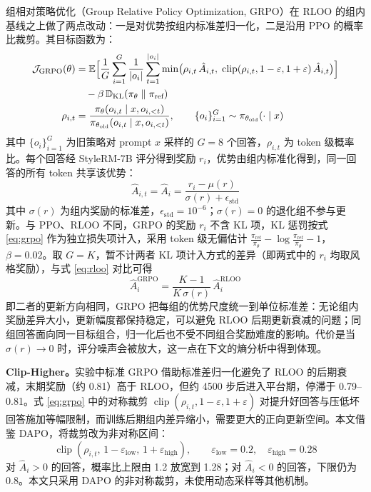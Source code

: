 \documentclass[fontset=fandol,type=master,campus=shenzhen,etitleauto=true]{hithesisbook}
\begin{document}
组相对策略优化（Group Relative Policy Optimization, GRPO）\cite{ref34}在 RLOO 的组内基线之上做了两点改动：一是对优势按组内标准差归一化，二是沿用 PPO 的概率比裁剪。其目标函数为：
\begin{equation}\label{eq:grpo}
\begin{aligned}
\mathcal{J}_{\text{GRPO}}(\theta) &= \mathbb{E} \Bigl[ \frac{1}{G}\sum_{i=1}^{G} \frac{1}{|o_i|}\sum_{t=1}^{|o_i|} \min\bigl( \rho_{i,t}\, \hat{A}_{i,t},\; \operatorname{clip}(\rho_{i,t}, 1-\varepsilon, 1+\varepsilon)\, \hat{A}_{i,t} \bigr) \Bigr] \\
&\quad - \beta\, \mathbb{D}_{\text{KL}}(\pi_\theta \parallel \pi_{\text{ref}}) \\
\rho_{i,t} &= \frac{\pi_\theta(o_{i,t} \mid x, o_{i,<t})}{\pi_{\theta_{\text{old}}}(o_{i,t} \mid x, o_{i,<t})}, \qquad \{o_i\}_{i=1}^{G} \sim \pi_{\theta_{\text{old}}}(\cdot \mid x)
\end{aligned}
\end{equation}
其中 $\{o_i\}_{i=1}^{G}$ 为旧策略对 prompt $x$ 采样的 $G = 8$ 个回答，$\rho_{i,t}$ 为 token 级概率比。每个回答经 StyleRM-7B 评分得到奖励 $r_i$，优势由组内标准化得到，同一回答的所有 token 共享该优势：
\begin{equation}
\hat{A}_{i,t} = \hat{A}_i = \frac{r_i - \mu(r)}{\sigma(r) + \epsilon_{\text{std}}}
\end{equation}
其中 $\sigma(r)$ 为组内奖励的标准差，$\epsilon_{\text{std}} = 10^{-6}$；$\sigma(r) = 0$ 的退化组不参与更新。与 PPO、RLOO 不同，GRPO 的奖励 $r_i$ 不含 KL 项，KL 惩罚按式 \eqref{eq:grpo} 作为独立损失项计入，采用 token 级无偏估计 $\frac{\pi_{\text{ref}}}{\pi_\theta} - \log \frac{\pi_{\text{ref}}}{\pi_\theta} - 1$\cite{ref34}，$\beta = 0.02$。取 $G = K$，暂不计两者 KL 项计入方式的差异（即两式中的 $r_i$ 均取风格奖励），与式 \eqref{eq:rloo} 对比可得
\begin{equation}\label{eq:rloo-grpo}
\hat{A}_i^{\text{GRPO}} = \frac{K - 1}{K\, \sigma(r)}\, \hat{A}_i^{\text{RLOO}}
\end{equation}
即二者的更新方向相同，GRPO 把每组的优势尺度统一到单位标准差：无论组内奖励差异大小，更新幅度都保持稳定，可以避免 RLOO 后期更新衰减的问题；同组回答面向同一目标组合，归一化后也不受不同组合奖励难度的影响。代价是当 $\sigma(r) \to 0$ 时，评分噪声会被放大，这一点在下文的熵分析中得到体现。

\textbf{Clip-Higher。}实验中标准 GRPO 借助标准差归一化避免了 RLOO 的后期衰减，末期奖励（约 0.81）高于 RLOO，但约 4500 步后进入平台期，停滞于 0.79--0.81。式 \eqref{eq:grpo} 中的对称裁剪 $\operatorname{clip}(\rho_{i,t}, 1-\varepsilon, 1+\varepsilon)$ 对提升好回答与压低坏回答施加等幅限制，而训练后期组内差异缩小，需要更大的正向更新空间。本文借鉴 DAPO\cite{ref35}，将裁剪改为非对称区间：
\begin{equation}\label{eq:clip-higher}
\operatorname{clip}(\rho_{i,t},\, 1 - \varepsilon_{\text{low}},\, 1 + \varepsilon_{\text{high}}), \qquad \varepsilon_{\text{low}} = 0.2, \quad \varepsilon_{\text{high}} = 0.28
\end{equation}
对 $\hat{A}_i > 0$ 的回答，概率比上限由 1.2 放宽到 1.28；对 $\hat{A}_i < 0$ 的回答，下限仍为 0.8。本文只采用 DAPO 的非对称裁剪，未使用动态采样等其他机制。
\end{document}
